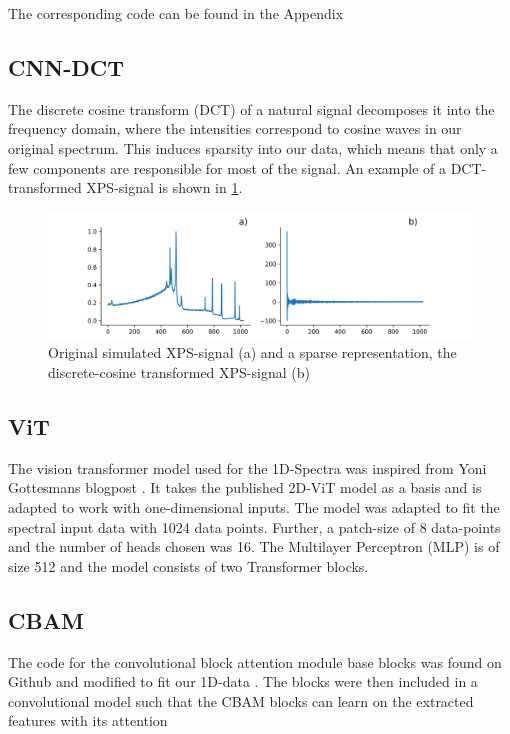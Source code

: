 
The corresponding code can be found in the Appendix 


\subsection{CNN-DCT}
The discrete cosine transform (DCT) of a natural signal decomposes it into the frequency domain, where the intensities correspond to cosine waves in our original spectrum. This induces sparsity into our data, which means that only a few components are responsible for most of the signal. An example of a DCT-transformed XPS-signal is shown in \ref{fig:dct}.

\begin{figure}[H]
    \centering
    \includegraphics[width=\textwidth]{Figures/dct.png}
    \caption{Original simulated XPS-signal (a) and a sparse representation, the discrete-cosine transformed XPS-signal (b)}
    \label{fig:dct}
\end{figure}


\subsection{ViT}
The vision transformer model used for the 1D-Spectra was inspired from Yoni Gottesmans blogpost \cite{noauthor_interpretable_2023}. It takes the published 2D-ViT model  as a basis and is adapted to work with one-dimensional inputs.
The model was adapted to fit the spectral input data with 1024 data points. Further, a patch-size of 8 data-points and the number of heads chosen was 16.
The Multilayer Perceptron (MLP) is of size 512 and the model consists of two Transformer blocks.




\subsection{CBAM}
The code for the convolutional block attention module base blocks was found on Github and modified to fit our 1D-data \cite{mazzia__2023}.
The blocks were then included in a convolutional model such that the CBAM blocks can learn on the extracted features with its attention 

